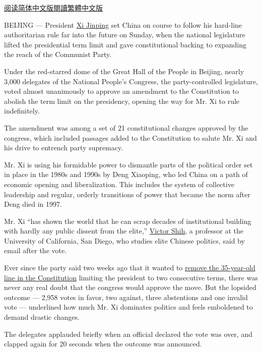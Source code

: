 \href{https://cn.nytimes3xbfgragh.onion/china/20180311/china-xi-constitution-term-limits/}{阅读简体中文版}\href{https://cn.nytimes3xbfgragh.onion/china/20180311/china-xi-constitution-term-limits/zh-hant/}{閱讀繁體中文版}

BEIJING --- President
\href{https://www.nytimes3xbfgragh.onion/topic/person/xi-jinping}{Xi
Jinping} set China on course to follow his hard-line authoritarian rule
far into the future on Sunday, when the national legislature lifted the
presidential term limit and gave constitutional backing to expanding the
reach of the Communist Party.

Under the red-starred dome of the Great Hall of the People in Beijing,
nearly 3,000 delegates of the National People's Congress, the
party-controlled legislature, voted almost unanimously to approve an
amendment to the Constitution to abolish the term limit on the
presidency, opening the way for Mr. Xi to rule indefinitely.

The amendment was among a set of 21 constitutional changes approved by
the congress, which included passages added to the Constitution to
salute Mr. Xi and his drive to entrench party supremacy.

Mr. Xi is using his formidable power to dismantle parts of the political
order set in place in the 1980s and 1990s by Deng Xiaoping, who led
China on a path of economic opening and liberalization. This includes
the system of collective leadership and regular, orderly transitions of
power that became the norm after Deng died in 1997.

Mr. Xi ``has shown the world that he can scrap decades of institutional
building with hardly any public dissent from the elite,''
\href{https://gps.ucsd.edu/faculty-directory/victor-shih.html}{Victor
Shih}, a professor at the University of California, San Diego, who
studies elite Chinese politics, said by email after the vote.

Ever since the party said two weeks ago that it wanted to
\href{https://www.nytimes3xbfgragh.onion/2018/02/25/world/asia/china-xi-jinping.html}{remove
the 35-year-old line in the Constitution} limiting the president to two
consecutive terms, there was never any real doubt that the congress
would approve the move. But the lopsided outcome --- 2,958 votes in
favor, two against, three abstentions and one invalid vote ---
underlined how much Mr. Xi dominates politics and feels emboldened to
demand drastic changes.

The delegates applauded briefly when an official declared the vote was
over, and clapped again for 20 seconds when the outcome was announced.


